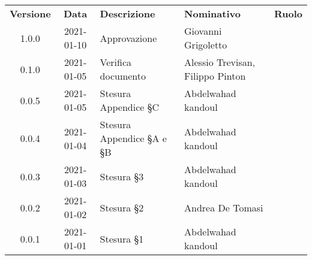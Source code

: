 {
    \renewcommand{\arraystretch}{1.5}
    \centering
    \begin{longtable}{ c c  C{3.5cm}  C{4cm}  c }
        \rowcolor{\primaryColor}
        \textcolor{\secondaryColor}{
        \textbf{Versione}}     & \textcolor{\secondaryColor}{\textbf{Data}}       & \textcolor{\secondaryColor}
        {\textbf{Descrizione}} & \textcolor{\secondaryColor}{\textbf{Nominativo}} & \textcolor{\secondaryColor}{\textbf{Ruolo}}                          \\


        1.0.0                   &2021-01-10                                        & Approvazione                                   &Giovanni Grigoletto & \responsabile{}\\
        0.1.0                  & 2021-01-05                                       & Verifica documento                            & Alessio Trevisan, Filippo Pinton &\verificatore{}\\
        0.0.5                  & 2021-01-05                                       & Stesura Appendice §C                         & Abdelwahad kandoul & \verificatore{} \\
        0.0.4                  & 2021-01-04                                       & Stesura Appendice §A e §B                          & Abdelwahad kandoul & \verificatore{} \\
        0.0.3                  & 2021-01-03                                       & Stesura §3                            & Abdelwahad kandoul & \verificatore{} \\
        0.0.2                  & 2021-01-02                                       & Stesura §2                              & Andrea De Tomasi & \verificatore{} \\
        0.0.1                  & 2021-01-01                                       & Stesura §1                            & Abdelwahad kandoul & \verificatore{} \\
    
    
    \end{longtable}
}